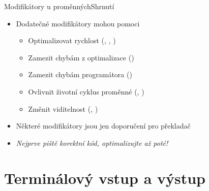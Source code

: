 \begin{frame}{Modifikátory u proměnných}{Shrnutí}

  \begin{itemize}
    \item Dodatečné modifikátory mohou pomoci
    \begin{itemize}
      \item Optimalizovat rychlost (, ,
        )

      \pause

      \item Zamezit chybám z optimalizace ()

      \pause

      \item Zamezit chybám programátora ()

      \pause

      \item Ovlivnit životní cyklus proměnné (, )

      \pause

      \item Změnit viditelnost (, )
    \end{itemize}

    \pause

    \item Některé modifikátory jsou jen doporučení pro překladač

    \pause

    \item \emph{Nejprve piště korektní kód, optimalizujte až poté!}

  \end{itemize}

\end{frame}


\section{Terminálový vstup a výstup}
\frame{\sectionpage}


